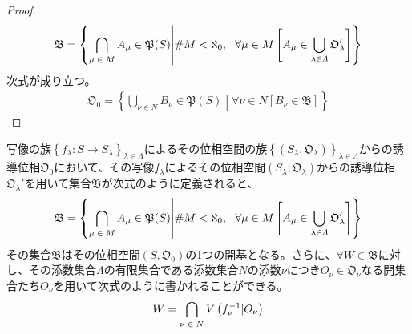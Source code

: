 \documentclass[dvipdfmx]{jsarticle}
\begin{document}
\begin{proof}
\begin{align*}
\mathfrak{B} =\left\{ \bigcap_{\scriptsize \begin{matrix}
\mu \in M \\
\end{matrix}} A_{\mu}\in \mathfrak{P}(S) \middle| {\#}M < \aleph_{0},\ \ \forall\mu \in M\left[ A_{\mu} \in \bigcup_{\lambda \in \varLambda} \mathfrak{O}_{\lambda}' \right] \right\}
\end{align*}
次式が成り立つ。
\begin{align*}
\mathfrak{O}_{0} = \left\{ \bigcup_{\nu \in N} B_{\nu}\in \mathfrak{P}(S) \middle| \forall\nu \in N\left[ B_{\nu}\in \mathfrak{B} \right] \right\}
\end{align*}
\end{proof}
\begin{thm}\label{8.1.4.6}
写像の族$\left\{ f_{\lambda}:S \rightarrow S_{\lambda} \right\}_{\lambda \in \varLambda}$によるその位相空間の族$\left\{ \left( S_{\lambda},\mathfrak{O}_{\lambda} \right) \right\}_{\lambda \in \varLambda}$からの誘導位相$\mathfrak{O}_{0}$において、その写像$f_{\lambda}$によるその位相空間$\left( S_{\lambda},\mathfrak{O}_{\lambda} \right)$からの誘導位相$\mathfrak{O}_{\lambda}'$を用いて集合$\mathfrak{B}$が次式のように定義されると、
\begin{align*}
\mathfrak{B} = \left\{ \bigcap_{\scriptsize \begin{matrix}
\mu \in M \\
\end{matrix}} A_{\mu}\in \mathfrak{P}(S) \middle| {\#}M < \aleph_{0},\ \ \forall\mu \in M\left[ A_{\mu} \in \bigcup_{\lambda \in \varLambda} \mathfrak{O}_{\lambda}' \right] \right\}
\end{align*}
その集合$\mathfrak{B}$はその位相空間$\left( S,\mathfrak{O}_{0} \right)$の1つの開基となる。さらに、$\forall W \in \mathfrak{B}$に対し、その添数集合$\varLambda$の有限集合である添数集合$N$の添数$\nu$につき$O_{\nu} \in \mathfrak{O}_{\nu}$なる開集合たち$O_{\nu}$を用いて次式のように書かれることができる。
\begin{align*}
W = \bigcap_{\scriptsize \begin{matrix}
\nu \in N \\
\end{matrix}} {V\left( f_{\nu}^{- 1}|O_{\nu} \right)}
\end{align*}
\end{thm}
\end{document}
